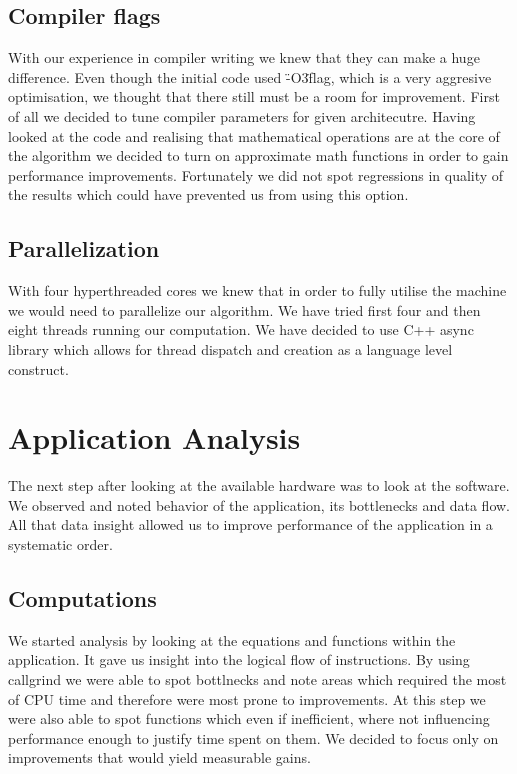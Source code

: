 \documentclass[conference]{IEEEtran}
\begin{document}
\subsection{Compiler flags}
With our experience in compiler writing we knew that they can make a huge difference. Even though the initial code used \"-O3\" flag, which is a very aggresive optimisation, we thought that there still must be a room for improvement. First of all we decided to tune compiler parameters for given architecutre. Having looked at the code and realising that mathematical operations are at the core of the algorithm we decided to turn on approximate math functions in order to gain performance improvements. Fortunately we did not spot regressions in quality of the results which could have prevented us from using this option.

\subsection{Parallelization}
With four hyperthreaded cores we knew that in order to fully utilise the machine we would need to parallelize our algorithm. We have tried first four and then eight threads running our computation. We have decided to use C++ async library which allows for thread dispatch and creation as a language level construct.

\section{Application Analysis}

The next step after looking at the available hardware was to look at the software.
We observed and noted behavior of the application, its bottlenecks and data flow.
All that data insight allowed us to improve performance of the application in a systematic order.

\subsection{Computations}
We started analysis by looking at the equations and functions within the application. 
It gave us insight into the logical flow of instructions. 
By using callgrind we were able to spot bottlnecks and note areas which required the most of CPU time and therefore were most prone to improvements.
At this step we were also able to spot functions which even if inefficient, where not influencing performance enough to justify time spent on them.
We decided to focus only on improvements that would yield measurable gains.
\end{document}
